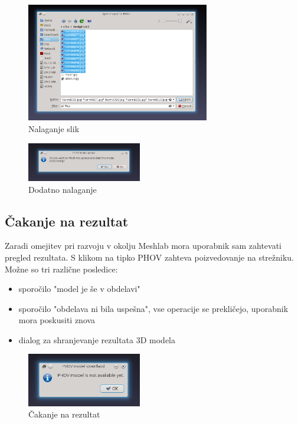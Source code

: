 \documentclass[11pt]{article}
\begin{document}
\begin{figure}[!htbp]
\centering
\includegraphics[width=8cm]{./images.png}
\caption{\label{fig:images}Nalaganje slik}
\end{figure}

\begin{figure}[!htbp]
\centering
\includegraphics[width=5cm]{./uploadother.png}
\caption{\label{fig:uploadother}Dodatno nalaganje}
\end{figure}

\subsection{Čakanje na rezultat}
\label{sec-2-2}
Zaradi omejitev pri razvoju v okolju Meshlab mora uporabnik sam zahtevati pregled rezultata. S klikom na
tipko PHOV zahteva poizvedovanje na strežniku. Možne so tri različne posledice:
\begin{itemize}
\item sporočilo "model je še v obdelavi"
\item sporočilo "obdelava ni bila uspešna", vse operacije se prekličejo, uporabnik mora poskusiti znova
\item dialog za shranjevanje rezultata 3D modela
\end{itemize}

\begin{figure}[!htbp]
\centering
\includegraphics[width=5cm]{./waiting.png}
\caption{\label{fig:waiting}Čakanje na rezultat}
\end{figure}
\end{document}
